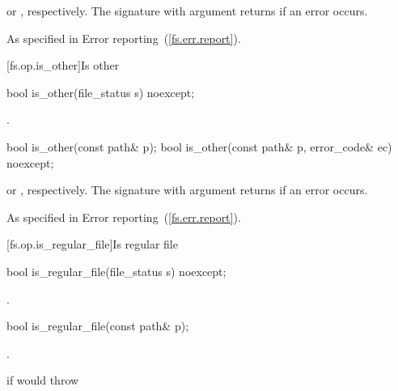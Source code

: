 \begin{itemdescr}
\pnum
\returns {} or , respectively.
The signature with argument  returns  if an error occurs.

\pnum
\throws As specified in Error reporting~(\ref{fs.err.report}).
\end{itemdescr}


[fs.op.is_other]{Is other}

%
\begin{itemdecl}
bool is_other(file_status s) noexcept;
\end{itemdecl}

\begin{itemdescr}
\pnum
\returns {}.
\end{itemdescr}

%
\begin{itemdecl}
bool is_other(const path& p);
bool is_other(const path& p, error_code& ec) noexcept;
\end{itemdecl}

\begin{itemdescr}
\pnum
\returns {} or ,
  respectively. The signature with argument  returns 
  if an error occurs.

\pnum
\throws As specified in Error reporting~(\ref{fs.err.report}).
\end{itemdescr}


[fs.op.is_regular_file]{Is regular file}

%
\begin{itemdecl}
bool is_regular_file(file_status s) noexcept;
\end{itemdecl}

\begin{itemdescr}
\pnum
\returns {}.
\end{itemdescr}

%
\begin{itemdecl}
bool is_regular_file(const path& p);
\end{itemdecl}

\begin{itemdescr}
\pnum
\returns {}.

\pnum
\throws {} if  would throw 
\end{itemdescr}

